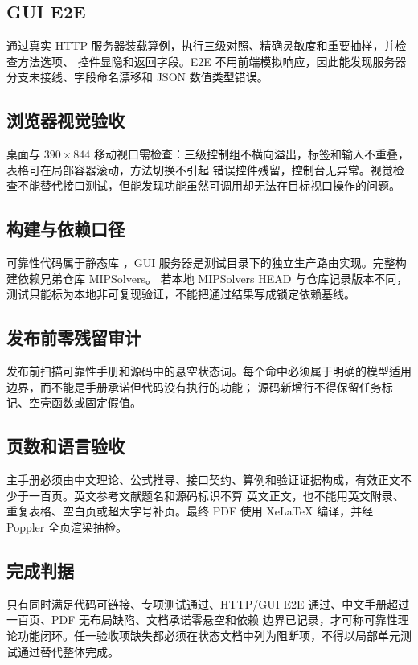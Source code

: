 \subsection{GUI E2E}
 通过真实 HTTP 服务器装载算例，执行三级对照、精确灵敏度和重要抽样，并检查方法选项、
控件显隐和返回字段。E2E 不用前端模拟响应，因此能发现服务器分支未接线、字段命名漂移和 JSON 数值类型错误。

\subsection{浏览器视觉验收}
桌面与 $390\times844$ 移动视口需检查：三级控制组不横向溢出，标签和输入不重叠，表格可在局部容器滚动，方法切换不引起
错误控件残留，控制台无异常。视觉检查不能替代接口测试，但能发现功能虽然可调用却无法在目标视口操作的问题。

\subsection{构建与依赖口径}
可靠性代码属于静态库 ，GUI 服务器是测试目录下的独立生产路由实现。完整构建依赖兄弟仓库 MIPSolvers。
若本地 MIPSolvers HEAD 与仓库记录版本不同，测试只能标为本地非可复现验证，不能把通过结果写成锁定依赖基线。

\subsection{发布前零残留审计}
发布前扫描可靠性手册和源码中的悬空状态词。每个命中必须属于明确的模型适用边界，而不能是手册承诺但代码没有执行的功能；
源码新增行不得保留任务标记、空壳函数或固定假值。

\subsection{页数和语言验收}
主手册必须由中文理论、公式推导、接口契约、算例和验证证据构成，有效正文不少于一百页。英文参考文献题名和源码标识不算
英文正文，也不能用英文附录、重复表格、空白页或超大字号补页。最终 PDF 使用 XeLaTeX 编译，并经 Poppler 全页渲染抽检。

\subsection{完成判据}
只有同时满足代码可链接、专项测试通过、HTTP/GUI E2E 通过、中文手册超过一百页、PDF 无布局缺陷、文档承诺零悬空和依赖
边界已记录，才可称可靠性理论功能闭环。任一验收项缺失都必须在状态文档中列为阻断项，不得以局部单元测试通过替代整体完成。
